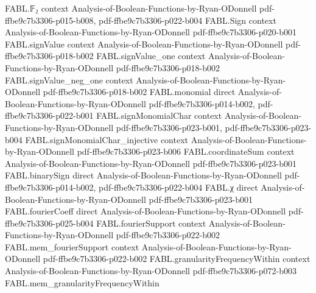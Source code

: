 \begin{theorem}
\label{FABL.isFourierSpectrumConcentratedOn_lowDegreeFourierFamily_iff}
\leanok
{}
\proofstep
  {FABL.𝔽₂}
  {context}
  {Analysis-of-Boolean-Functions-by-Ryan-ODonnell}
  {pdf-ffbe9c7b3306-p015-b008,
    pdf-ffbe9c7b3306-p022-b004}
\proofstep
  {FABL.Sign}
  {context}
  {Analysis-of-Boolean-Functions-by-Ryan-ODonnell}
  {pdf-ffbe9c7b3306-p020-b001}
\proofstep
  {FABL.signValue}
  {context}
  {Analysis-of-Boolean-Functions-by-Ryan-ODonnell}
  {pdf-ffbe9c7b3306-p018-b002}
\proofstep
  {FABL.signValue_one}
  {context}
  {Analysis-of-Boolean-Functions-by-Ryan-ODonnell}
  {pdf-ffbe9c7b3306-p018-b002}
\proofstep
  {FABL.signValue_neg_one}
  {context}
  {Analysis-of-Boolean-Functions-by-Ryan-ODonnell}
  {pdf-ffbe9c7b3306-p018-b002}
\proofstep
  {FABL.monomial}
  {direct}
  {Analysis-of-Boolean-Functions-by-Ryan-ODonnell}
  {pdf-ffbe9c7b3306-p014-b002,
    pdf-ffbe9c7b3306-p022-b001}
\proofstep
  {FABL.signMonomialChar}
  {context}
  {Analysis-of-Boolean-Functions-by-Ryan-ODonnell}
  {pdf-ffbe9c7b3306-p023-b001,
    pdf-ffbe9c7b3306-p023-b004}
\proofstep
  {FABL.signMonomialChar_injective}
  {context}
  {Analysis-of-Boolean-Functions-by-Ryan-ODonnell}
  {pdf-ffbe9c7b3306-p023-b006}
\proofstep
  {FABL.coordinateSum}
  {context}
  {Analysis-of-Boolean-Functions-by-Ryan-ODonnell}
  {pdf-ffbe9c7b3306-p023-b001}
\proofstep
  {FABL.binarySign}
  {direct}
  {Analysis-of-Boolean-Functions-by-Ryan-ODonnell}
  {pdf-ffbe9c7b3306-p014-b002,
    pdf-ffbe9c7b3306-p022-b004}
\proofstep
  {FABL.χ}
  {direct}
  {Analysis-of-Boolean-Functions-by-Ryan-ODonnell}
  {pdf-ffbe9c7b3306-p023-b001}
\proofstep
  {FABL.fourierCoeff}
  {direct}
  {Analysis-of-Boolean-Functions-by-Ryan-ODonnell}
  {pdf-ffbe9c7b3306-p025-b004}
\proofstep
  {FABL.fourierSupport}
  {context}
  {Analysis-of-Boolean-Functions-by-Ryan-ODonnell}
  {pdf-ffbe9c7b3306-p022-b002}
\proofstep
  {FABL.mem_fourierSupport}
  {context}
  {Analysis-of-Boolean-Functions-by-Ryan-ODonnell}
  {pdf-ffbe9c7b3306-p022-b002}
\proofstep
  {FABL.granularityFrequencyWithin}
  {context}
  {Analysis-of-Boolean-Functions-by-Ryan-ODonnell}
  {pdf-ffbe9c7b3306-p072-b003}
\proofstep
  {FABL.mem_granularityFrequencyWithin}

\end{theorem}

